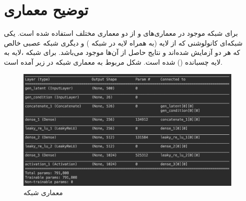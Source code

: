 \documentclass{article}
\begin{document}
\section{توضیح معماری }
برای شبکه  موجود در معماری‌های  و  از دو معماری مختلف استفاده‌ شده است. یکی شبکه‌ای کانولوشنی که از لایه  (به همراه لایه   در شبکه ) و دیگری شبکه عصبی  خالص که هر دو آزمایش شده‌اند و نتایج حاصل از آن‌ها موجود می‌باشد. برای شبکه ،‌لایه  به لایه  چسبانده () شده است. شکل مربوط به معماری شبکه‌  در زیر آمده است.
\begin{figure}[H]
	\centerline{\includegraphics[width=\textwidth , height=\textheight ]{G}}
	\caption{معماری شبکه }
\end{figure}
\end{document}
